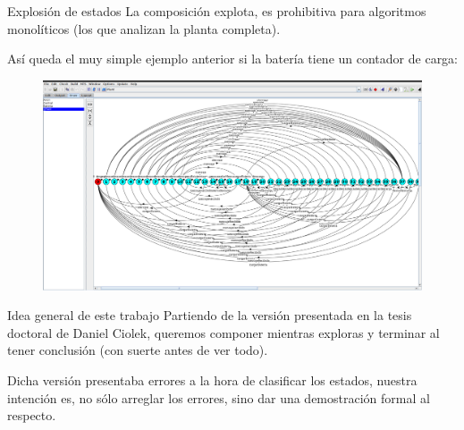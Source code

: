 \begin{frame}{Explosión de estados}
    La composición explota, es prohibitiva para algoritmos monolíticos (los que analizan la planta completa).
    
    Así queda el muy simple ejemplo anterior si la batería tiene un contador de carga:
    \begin{figure}
    	\includegraphics[width=\textwidth]{figures/big-plant.png}
    \end{figure}
\end{frame}
\begin{frame}{Idea general de este trabajo}
    Partiendo de la versión presentada en la tesis doctoral de Daniel Ciolek, queremos componer mientras exploras y terminar al tener conclusión (con suerte antes de ver todo).
    
    Dicha versión presentaba errores a la hora de clasificar los estados, nuestra intención es, no sólo arreglar los errores, sino dar una demostración formal al respecto.
    
\end{frame}
